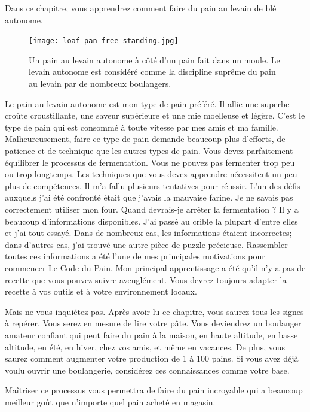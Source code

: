 \begin{quoting}
Dans ce chapitre, vous apprendrez comment faire
du pain au levain de blé autonome.
\end{quoting}

\begin{figure}[!htb]
  \texttt{[image: loaf-pan-free-standing.jpg]}
  \caption[Pain autonome et pain en moule]{Un pain au levain autonome
      à côté d'un pain fait dans un moule.  Le levain autonome est considéré
      comme la discipline suprême du pain au levain par de nombreux boulangers.}
\end{figure}

Le pain au levain autonome est mon type de pain préféré. Il allie une superbe croûte croustillante, une saveur supérieure et une mie moelleuse et légère. C'est le type de pain qui est consommé à toute vitesse par mes amis et ma famille. Malheureusement, faire ce type de pain demande beaucoup plus d'efforts, de patience et de technique que les autres types de pain. Vous devez parfaitement équilibrer le processus de fermentation. Vous ne pouvez pas fermenter trop peu ou trop longtemps. Les techniques que vous devez apprendre nécessitent un peu plus de compétences. Il m'a fallu plusieurs tentatives pour réussir. L'un des défis auxquels j'ai été confronté était que j’avais la mauvaise farine. Je ne savais pas correctement utiliser mon four. Quand devrais-je arrêter la fermentation ? Il y a beaucoup d'informations disponibles. J'ai passé au crible la plupart d'entre elles et j'ai tout essayé. Dans de nombreux cas, les informations étaient incorrectes; dans d'autres cas, j’ai trouvé une autre pièce de puzzle précieuse. Rassembler toutes ces informations a été l'une de mes principales motivations pour commencer Le Code du Pain. Mon principal apprentissage a été qu'il n'y a pas de recette que vous pouvez suivre aveuglément. Vous devrez toujours adapter la recette à vos outils et à votre environnement locaux.

Mais ne vous inquiétez pas. Après avoir lu ce chapitre, vous saurez tous les signes à repérer. Vous serez en mesure de lire votre pâte. Vous deviendrez un boulanger amateur confiant qui peut faire du pain à la maison, en haute altitude, en basse altitude, en été, en hiver, chez vos amis, et même en vacances. De plus, vous saurez comment augmenter votre production de 1 à 100 pains. Si vous avez déjà voulu ouvrir une boulangerie, considérez ces connaissances comme votre base.

Maîtriser ce processus vous permettra de faire du pain incroyable qui a beaucoup meilleur goût que n'importe quel pain acheté en magasin.

